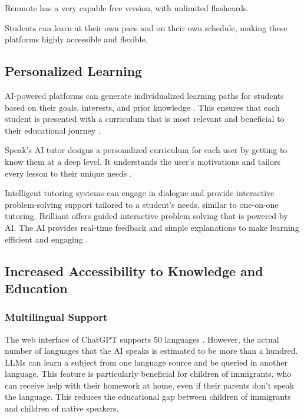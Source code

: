 \documentclass{article}
\begin{document}
Remnote has a very capable free version, with unlimited flashcards.

Students can learn at their own pace and on their own schedule,
making these platforms highly accessible and flexible.

\subsection{Personalized Learning}

AI-powered platforms can generate individualized learning paths for
students based on their goals, interests, and prior knowledge
\cite{elearningindustry_ai_personalization}.
This ensures that each student is presented with a curriculum that is most relevant and beneficial to their educational journey
\cite{thinkful_ai_adaptive_curriculum}.

Speak's AI tutor designs a personalized curriculum for each user
by getting to know them at a deep level. It understands the user's
motivations and tailors every lesson to their unique needs
\cite{speak}.

Intelligent tutoring systems can engage in dialogue and provide
interactive problem-solving support tailored to a student's needs,
similar to one-on-one tutoring. Brilliant offers guided interactive
problem solving that is powered by AI. The AI provides real-time
feedback and simple explanations to make learning efficient and
engaging \cite{brilliant}.

\subsection{Increased Accessibility to Knowledge and Education}

\subsubsection{Multilingual Support}

The web interface of ChatGPT supports 50 languages \cite{openai_language_setting}.
However, the actual number of languages that the AI speaks
is estimated to be more than a hundred. LLMs can learn a
subject from one language source and be queried in another language.
This feature is particularly beneficial for children of immigrants,
who can receive help with their homework at home,
even if their parents don't speak the language.
This reduces the educational gap between children of immigrants
and children of native speakers.
\end{document}
